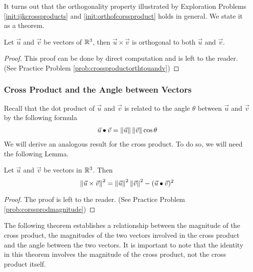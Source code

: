 \documentclass{ximera}
\begin{document}
It turns out that the orthogonality property illustrated by Exploration Problems \ref{init:ijkcrossproducts} and \ref{init:orthofcorssproduct}  holds in general.  We state it as a theorem.
 
\begin{theorem}\label{th:crossproductorthtouandv}
Let $\vec{u}$ and $\vec{v}$ be vectors of $\mathbb{R}^3$, then $\vec{u}\times\vec{v}$ is orthogonal to both $\vec{u}$ and $\vec{v}$.
\end{theorem}
\begin{proof}This proof can be done by direct computation and is left to the reader.  (See Practice Problem \ref{prob:crossproductorthtouandv})
\end{proof}
 
\subsubsection*{Cross Product and the Angle between Vectors}
Recall that the dot product of $\vec{u}$ and $\vec{v}$ is related to the angle $\theta$ between $\vec{u}$ and $\vec{v}$ by the following formula
\begin{align}\label{eq:dotproductformula}\vec{u}\bullet\vec{v}=\left\|\vec{u}\right\|\left\|\vec{v}\right\|\cos\theta\end{align}
We will derive an analogous result for the cross product.  To do so, we will need the following Lemma.
 
\begin{lemma}\label{lemma:crossprodmagnitude}
Let $\vec{u}$ and $\vec{v}$ be vectors in $\mathbb{R}^3$.  Then
$$\left\|\vec{u}\times\vec{v}\right\|^2=\left\|\vec{u}\right\|^2\left\|\vec{v}\right\|^2-(\vec{u}\bullet\vec{v})^2$$
\end{lemma}
\begin{proof} The proof is left to the reader.  (See Practice Problem \ref{prob:corssprodmagnitude})
\end{proof}
 
The following theorem establishes a relationship between the magnitude of the cross product, the magnitudes of the two vectors involved in the cross product and the angle between the two vectors.  It is important to note that  the identity in this theorem involves the magnitude of the cross product, not the cross product itself.
 
\end{document}
